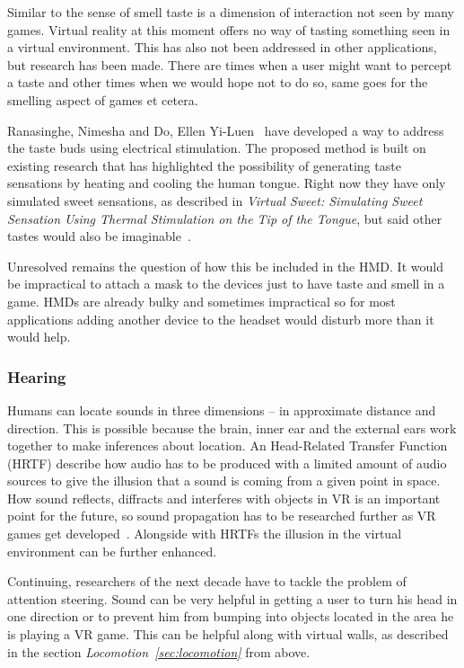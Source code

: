 Similar to the sense of smell taste is a dimension of interaction not seen by many games. Virtual reality at this moment offers no way of tasting something seen in a virtual environment. This has also not been addressed in other applications, but research has been made. There are times when a user might want to percept a taste and other times when we would hope not to do so, same goes for the smelling aspect of games et cetera.

Ranasinghe, Nimesha and Do, Ellen Yi-Luen~\cite{Ranasinghe:2016:VSS:2984751.2985729} have developed a way to address the taste buds using electrical stimulation. The proposed method is built on existing research that has highlighted the possibility of generating taste sensations by heating and cooling the human tongue. Right now they have only simulated sweet sensations, as described in \textit{Virtual Sweet: Simulating Sweet Sensation Using Thermal	Stimulation on the Tip of the Tongue}, but said other tastes would also be imaginable~\cite{Ranasinghe:2016:VSS:2984751.2985729}.

Unresolved remains the question of how this be included in the HMD. It would be impractical to attach a mask to the devices just to have taste and smell in a game. HMDs are already bulky and sometimes impractical so for most applications adding another device to the headset would disturb more than it would help.

\subsubsection{Hearing}

Humans can locate sounds in three dimensions – in approximate distance and direction. This is possible because the brain, inner ear and the external ears work together to make inferences about location.\newline
An Head-Related Transfer Function (HRTF) describe how audio has to be produced with a limited amount of audio sources to give the illusion that a sound is coming from a given point in space.\newline
How sound reflects, diffracts and interferes with objects in VR is an important point for the future, so sound propagation has to be researched further as VR games get developed~\cite{online:oculusKeynote}. Alongside with HRTFs the illusion in the virtual environment can be further enhanced.

Continuing, researchers of the next decade have to tackle the problem of attention steering. Sound can be very helpful in getting a user to turn his head in one direction or to prevent him from bumping into objects located in the area he is playing a VR game. This can be helpful along with virtual walls, as described in the section \textit{Locomotion~\ref{sec:locomotion}} from above.

